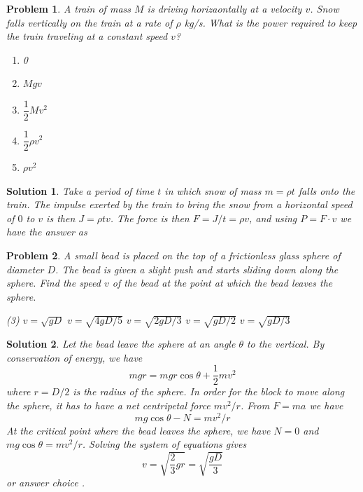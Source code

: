 \documentclass[12pt]{article}
\newcommand{\clearpts}{\addtocounter{tpts}{\value{cpts}} \setcounter{cpts}{0}}
\newcommand{\pts}[1]{\clearpts \setcounter{cpts}{#1}}
\newtheorem*{solution}{Solution}
\theoremstyle{mystyle}
\newtheorem{pproblem}{Problem}
\begin{document}
\pts{2}
\begin{pproblem}
    A train of mass $M$ is driving horizaontally at a velocity $v$. Snow falls vertically on the train at a rate of $\rho$ kg/s. What is the power required to keep the train traveling at a constant speed $v$?
    \begin{enumerate}[label=\Alph*)]
        \item 0
        \item $Mgv$
        \item $\dfrac{1}{2}Mv^2$
        \item $\dfrac{1}{2}\rho v^2$
        \item $\rho v^2$
    \end{enumerate}
\end{pproblem}
\begin{solution}
    Take a period of time $t$ in which snow of mass $m = \rho t$ falls onto the train. The impulse exerted by the train to bring the snow from a horizontal speed of $0$ to $v$ is then $J=\rho t v$. The force is then $F = J/t = \rho v$,
    and using $P = F\cdot v$ we have the answer as 
\end{solution}

\pts{2}
\begin{pproblem}
    A small bead is placed on the top of a frictionless glass sphere of
    diameter $D$. The bead is given a slight push and starts sliding
    down along the sphere. Find the speed $v$ of the bead at the point
    at which the bead leaves the sphere.

    \begin{figure}[H]
        \centering
    \end{figure}

    \begin{tasks}[label=(\Alph*),label-width=20px](3)
        \task $v=\sqrt{gD}$
        \task $v=\sqrt{4gD/5}$
        \task $v=\sqrt{2gD/3}$
        \task $v=\sqrt{gD/2}$
        \task $v=\sqrt{gD/3}$
    \end{tasks}
\end{pproblem}
\begin{solution}
    Let the bead leave the sphere at an angle $\theta$ to the vertical.
    By conservation of energy, we have \[
        mgr=mgr\cos\theta+\dfrac{1}{2}mv^2
    \]
    where $r=D/2$ is the radius of the sphere. In order for the block to
    move along the sphere, it has to have a net centripetal force $mv^2/r$.
    From $F=ma$ we have \[
        mg\cos\theta-N=mv^2/r
    \]
    At the critical point where the bead leaves the sphere, we have $N=0$
    and $mg\cos\theta=mv^2/r$.
    Solving the system of equations gives \[
        v=\sqrt{\dfrac{2}{3}gr}=\sqrt{\dfrac{gD}3}
    \]
    or answer choice .
\end{solution}
\end{document}
